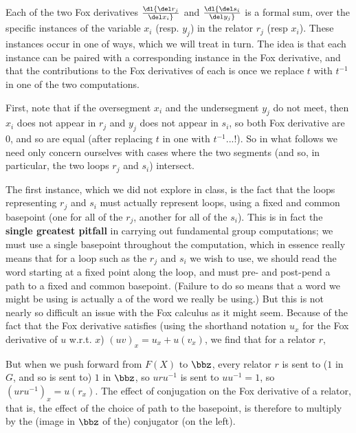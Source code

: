\msk

Each of the two Fox derivatives $\dl {{\del r_j}\over{\del x_i}}$ and
$\dl {{\del s_i}\over{\del y_j}}$ is a formal sum, over the 
specific instances of the variable $x_i$
(resp. $y_j$) in the relator $r_j$ (resp $x_i$). These instances occur in one of 
 ways, which we will treat in turn. The idea is that each instance can be 
paired with a corresponding instance in the  Fox derivative, and
that the contributions to the Fox derivatives of each is  once
we replace $t$ with $t^{-1}$ in one of the two computations. 

\ssk

First, note that if the oversegment $x_i$ and the undersegment $y_j$ do not meet,
then $x_i$ does not appear in $r_j$ and $y_j$ does not appear in $s_i$,
so both Fox derivative are $0$, and so are equal (after replacing $t$ in one 
with $t^{-1}$...!). So in what follows we need only concern ourselves
with cases where the two segments (and so, in particular, the two 
loops $r_j$ and $s_i$) intersect.

\msk

The first instance, which we did not explore in class, is the fact that the loops
representing $r_j$ and $s_i$ must actually represent  loops, using
a fixed and common basepoint (one for all of the $r_j$, another for all of the $s_i$).
This is in fact the {\bf single greatest pitfall} in carrying out fundamental
group computations; we must use a single basepoint throughout the computation, which in
essence really means that for a loop such as the $r_j$ and $s_i$ we wish to use, we should
read the word starting at a fixed point along the loop, 
and must pre- and post-pend a path to a fixed
and common basepoint. (Failure to do so means that a word we might be using is
actually a  of the word we really  be using.) But this is 
not nearly so difficult an issue with the Fox calculus as it might seem. Because
of the fact that the Fox derivative satisfies (using the shorthand notation
$u_x$ for the Fox derivative of $u$ w.r.t. $x$) $(uv)_x=u_x+u(v_x)$, we find that
for a relator $r$,

\ssk


\ssk

But when we push forward from $F(X)$ to $\bbz$, every relator $r$ is sent to ($1$ in $G$,
and so is sent to) $1$ in $\bbz$, so $uru^{-1}$ is sent to $uu^{-1}=1$, so 
$(uru^{-1})_x=u(r_x)$. The effect of conjugation on the Fox derivative of a relator,
that is, the effect of the choice of path to the basepoint, 
is therefore to multiply by the (image in $\bbz$ of the) conjugator (on the left). 

